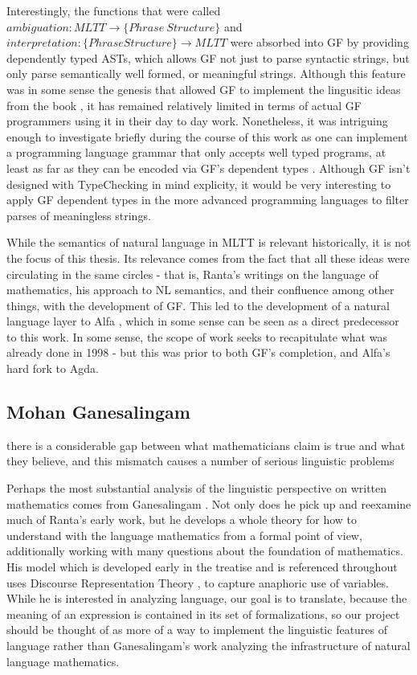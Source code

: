 Interestingly, the functions that were called $ambiguation : MLTT \to \{Phrase\
Structure\}$ and $interpretation : \{Phrase Structure\} \to MLTT$ were absorbed
into GF by providing dependently typed ASTs, which allows GF not just to parse
syntactic strings, but only parse semantically well formed, or meaningful
strings. Although this feature was in some sense the genesis that allowed GF to
implement the lingusitic ideas from the book \cite{rantaTT}, it has remained
relatively limited in terms of actual GF programmers using it in their day to
day work. Nonetheless, it was intriguing enough to investigate briefly during
the course of this work as one can implement a programming language grammar that
only accepts well typed programs, at least as far as they can be encoded via
GF's dependent types \cite{warrickHarper}. Although GF isn't designed with
TypeChecking in mind explicity, it would be very interesting to apply GF
dependent types in the more advanced programming languages to filter parses of
meaningless strings.

While the semantics of natural language in MLTT is relevant historically, it is
not the focus of this thesis. Its relevance comes from the fact that all these
ideas were circulating in the same circles - that is, Ranta's writings on the
language of mathematics, his approach to NL semantics, and their confluence
among other things, with the development of GF. This led to the development of a
natural language layer to Alfa \cite{alfaGF}, which in some sense can be seen as
a direct predecessor to this work. In some sense, the scope of work seeks to
recapitulate what was already done in 1998 - but this was prior to both GF's
completion, and Alfa's hard fork to Agda.

\subsection{Mohan Ganesalingam}


\begin{displayquote}

there is a considerable gap between what mathematicians claim is true and what
they believe, and this mismatch causes a number of serious linguistic problems

\end{displayquote}

Perhaps the most substantial analysis of the linguistic perspective on written
mathematics comes from Ganesalingam \cite{ganesalingam2013language}. Not only
does he pick up and reexamine much of Ranta's early work, but he develops a
whole theory for how to understand with the language mathematics from a formal
point of view, additionally working with many questions about the foundation of
mathematics. His model which is developed early in the treatise and is
referenced throughout uses Discourse Representation Theory
\cite{kamp2011discourse}, to capture anaphoric use of variables. While he is
interested in analyzing language, our goal is to translate, because the meaning
of an expression is contained in its set of formalizations, so our project should be
thought of as more of 
a way to implement the linguistic features of language rather than
Ganesalingam's work analyzing the infrastructure of natural language mathematics.

